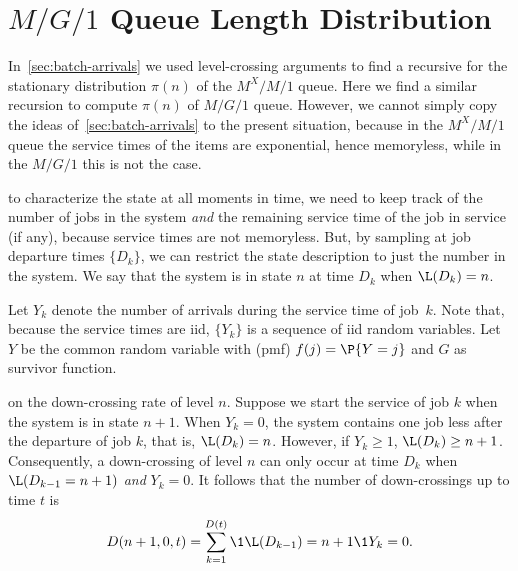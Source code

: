 

\section{$M/G/1$ Queue Length Distribution}\label{sec:distr-queue-length}



In~\cref{sec:batch-arrivals} we used level-crossing arguments to find a recursive for the stationary distribution $\pi(n)$ of the $M^X/M/1$ queue.
Here we find a similar recursion to compute $\pi(n)$ of $M/G/1$ queue.
However, we cannot simply copy the ideas of~\cref{sec:batch-arrivals} to the present situation, because in the $M^X/M/1$ queue the service times of the items are exponential, hence memoryless, while in the $M/G/1$ this is not the case.




 to characterize the state at all moments in time, we need to keep track of the number of jobs in the system \emph{and} the remaining service time of the job in service (if any), because service times are not memoryless.
But, by sampling at job departure times $\{D_k\}$, we can restrict the state description to just the number in the system.
We say that the system is in state $n$ at time $D_k$ when $\L(D_k)=n$.

Let $Y_k$ denote the number of arrivals during the service time of job~$k$.
Note that, because the service times are iid, $\{Y_k\}$ is a sequence of iid random variables.
Let $Y$ be the common random variable with (pmf) $f(j) = \P{Y = j}$ and $G$ as survivor function.



 on the down-crossing rate of level $n$.
Suppose we start the service of job $k$ when the system is in state $n+1$.
When $Y_k=0$, the system contains one job less
after the departure of job $k$, that is, $\L(D_k) = n$.
However, if $Y_k\geq 1$,  $\L(D_k) \geq  n +1$.
Consequently, a down-crossing of level $n$ can only occur at time $D_k$ when $\L(D_{k-1}=n+1)$ \emph{and} $Y_k = 0$.
It follows that the number of down-crossings up to time $t$ is
\begin{equation*}
 D(n+1, 0, t)  = \sum_{k=1}^{D(t)}\1{\L(D_{k-1})=n+1}\1{Y_k=0}.
\end{equation*}


